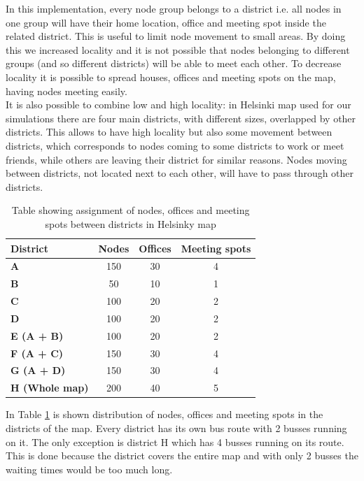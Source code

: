 In this implementation, every node group belongs to a district i.e. all nodes in one group will have their home location, office and meeting spot inside the related district. This is useful to limit node movement to small areas. By doing this we increased locality and it is not possible that nodes belonging to different groups (and so different districts) will be able to meet each other. To decrease locality it is possible to spread houses, offices and meeting spots on the map, having nodes meeting easily.
\\

It is also possible to combine low and high locality: in Helsinki map used for our simulations there are four main districts, with different sizes, overlapped by other districts. This allows to have high locality but also some movement between districts, which corresponds to nodes coming to some districts to work or meet friends, while others are leaving their district for similar reasons. Nodes moving between districts, not located next to each other, will have to pass through other districts. 
\\

\begin{table}[h]
\begin{center}
\begin{tabular}{|l|c|c|c|}
\hline
\textbf{District} & \textbf{Nodes} & \textbf{Offices} & \textbf{Meeting spots}\\
\hline
\hline
\bfseries A & 150 & 30 & 4 \\
\hline
\bfseries B & 50 & 10 & 1 \\
\hline
\bfseries C & 100 & 20 & 2 \\
\hline
\bfseries D & 100 & 20 & 2 \\
\hline
\bfseries E (A + B) & 100 & 20 & 2 \\
\hline
\bfseries F (A + C) & 150 & 30 & 4 \\
\hline
\bfseries G (A + D) & 150 & 30 & 4 \\
\hline
\bfseries H (Whole map) & 200 & 40 & 5 \\
\hline
\end{tabular}
\end{center}
\caption[Helsinky map districts]{Table showing assignment of nodes, offices and meeting spots between districts in Helsinky map}    
\label{tabellaDistrettiMappa}
\end{table}

In Table \ref{tabellaDistrettiMappa} is shown distribution of nodes, offices and meeting spots in the districts of the map. Every district has its own bus route with 2 busses running on it. The only exception is district H which has 4 busses running on its route. This is done because the district covers the entire map and with only 2 busses the waiting times would be too much long.

